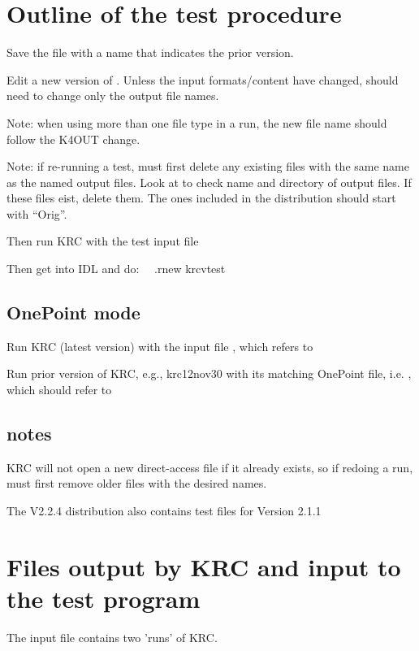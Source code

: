 \documentclass{article}  %
\begin{document}
\section{Outline of the test procedure}

Save the   file with a name that indicates the prior version.

Edit a new version of .  Unless the input formats/content have changed, should need to change only the output file names.

Note: when using more than one file type in a run, the new file name should follow the K4OUT change.

Note: if re-running a test, must first delete any existing files with the same name as the  named output files. Look at  to check name and directory of output files. If these files eist, delete them. The ones included in the distribution should start with ``Orig''. 

Then run KRC with the test input file

Then get into IDL and do: \ \  .rnew krcvtest

\subsection{OnePoint mode} %
Run KRC (latest version) with the input file , which refers to  

Run prior version of KRC, e.g.,  krc12nov30 with its matching OnePoint file, i.e.  , which should refer to  

\subsection{notes} %

KRC will not open a new direct-access file if it already exists, so if redoing a run, must first remove older files with the desired names.

The V2.2.4 distribution also contains test files for Version 2.1.1
\section{Files output by KRC and input to the test program \label{finput}} %

The input file  contains two 'runs' of KRC.
\end{document}
